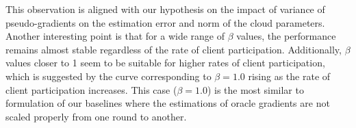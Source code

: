 \documentclass[runningheads]{llncs}
\begin{document}
This observation is aligned with our hypothesis on the impact of variance of pseudo-gradients on the estimation error and norm of the cloud parameters. Another interesting point is that for a wide range of $\beta$ values, the performance remains almost stable regardless of the rate of client participation. Additionally, $\beta$ values closer to 1 seem to be suitable for higher rates of client participation, which is suggested by the curve corresponding to $\beta=1.0$ rising as the rate of client participation increases. This case ($\beta=1.0$) is the most similar to formulation of our baselines where the estimations of oracle gradients are not scaled properly from one round to another.
\begin{figure}[tb!]
  \centering
  \def\svgwidth{12.0cm}
  \begingroup \makeatletter \providecommand{}\providecommand{}\providecommand{}\newcommand*{}\newcommand*\lineheight[1]{\fontsize{\fsize}{#1\fsize}\selectfont}\ifx\svgwidth\undefined \setlength{\unitlength}{619.25939941bp}\ifx\svgscale\undefined \relax \else \setlength{\unitlength}{\unitlength * \real{\svgscale}}\fi \else \setlength{\unitlength}{\svgwidth}\fi \global\let\svgwidth\undefined \global\let\svgscale\undefined \makeatother 
\end{figure}
\end{document}
